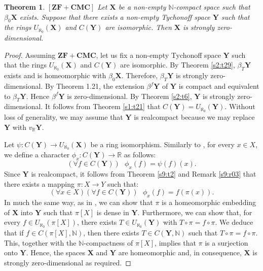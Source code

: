 \documentclass[12pt,twoside,leqno]{article}
\theoremstyle{plain}
\newtheorem{theorem}{Theorem}[section]
\theoremstyle{definition}
\theoremstyle{remark}
\begin{document}
\begin{theorem}
	\label{s10:t3}
	$[\mathbf{ZF+CMC}]$ Let $\mathbf{X}$ be a non-empty $\mathbb{N}$-compact space such that $\beta_0\mathbf{X}$ exists. Suppose that there exists a non-empty Tychonoff space $\mathbf{Y}$ such that the rings $U_{\aleph_0}(\mathbf{X})$ and $C(\mathbf{Y})$ are isomorphic. Then $\mathbf{X}$ is strongly zero-dimensional.
\end{theorem}
\begin{proof}
	Assuming $\mathbf{ZF+CMC}$, let us fix a non-empty Tychonoff space $\mathbf{Y}$ such that the rings $U_{\aleph_0}(\mathbf{X})$ and $C(\mathbf{Y})$ are isomorphic. By Theorem \ref{s2:t29},  $\beta_{T}\mathbf{Y}$ exists and is homeomorphic with $\beta_0\mathbf{X}$. Therefore, $\beta_T\mathbf{Y}$ is strongly zero-dimensional. By Theorem 1.21, the extension $\beta^{f}\mathbf{Y}$ of $\mathbf{Y}$ is compact and equivalent to $\beta_T\mathbf{Y}$. Hence $\beta^{f}\mathbf{Y}$ is zero-dimensional. By Theorem \ref{s2:t6}, $\mathbf{Y}$ is strongly zero-dimensional. It follows from Theorem \ref{s1:t21} that $C(\mathbf{Y})=U_{\aleph_0}(\mathbf{Y})$.  Without loss of generality, we may assume that $\mathbf{Y}$ is realcompact because we may replace $\mathbf{Y}$ with $v_{\mathbb{R}}\mathbf{Y}$.
	
	Let $\psi: C(\mathbf{Y})\to U_{\aleph_0}(\mathbf{X})$ be a ring isomorphism. Similarly to \cite{ol}, for every $x\in X$, we define a character $\phi_x: C(\mathbf{Y})\to\mathbb{R}$ as follows: 
	$$(\forall f\in C(\mathbf{Y}))\text{ } \phi_x(f)=\psi(f)(x).$$
	Since $\mathbf{Y}$ is realcompact, it follows from Theorem \ref{s9:t2} and Remark \ref{s9:r03} that there exists a mapping $\pi: X\to Y$ such that:
	$$(\forall x\in X)(\forall f\in C(\mathbf{Y})) \text{ } \phi_x(f)=f(\pi(x)).$$
	In much the same way, as in \cite{ol}, we can show that $\pi$ is a homeomorphic embedding of $\mathbf{X}$ into $\mathbf{Y}$ such that $\pi[X]$ is dense in $\mathbf{Y}$. Furthermore, we can show that, for every $f\in U_{\aleph_0}(\pi[X])$, there exists $T\in U_{\aleph_0}(\mathbf{Y})$ with $T\circ\pi= f\circ\pi$. We deduce that if $f\in C(\pi[X], \mathbb{N})$, then there exists $T\in C(\mathbf{Y}, \mathbb{N})$ such that $T\circ\pi=f\circ\pi$. This, together with the $\mathbb{N}$-compactness of $\pi[X]$, implies that $\pi$ is a surjection onto $\mathbf{Y}$. Hence, the spaces $\mathbf{X}$ and $\mathbf{Y}$ are homeomorphic and, in consequence, $\mathbf{X}$ is strongly zero-dimensional as required.
\end{proof}
\end{document}
